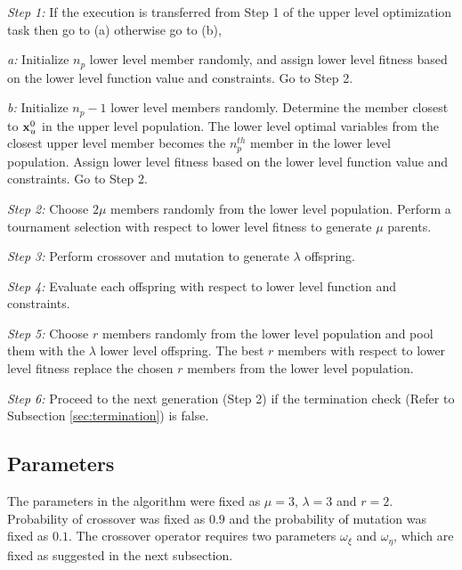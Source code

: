 \documentclass[twoside]{article}
\begin{document}
\textit{}
\vspace{-7mm}

\textit{Step 1:} If the execution is transferred from Step 1 of the upper level optimization task then go to (a) otherwise go to (b),

\quad \textit{a:} Initialize $n_p$ lower level member randomly, and assign lower level fitness based on the lower level function value and constraints. Go to Step 2.

\quad \textit{b:} Initialize $n_p-1$ lower level members randomly. Determine the member closest to $\mbox{$\mathbf{x}$}_{u}^{0}$ in the upper level population. The lower level optimal variables from the closest upper level member becomes the $n_{p}^{th}$ member in the lower level population. Assign lower level fitness based on the lower level function value and constraints. Go to Step 2.

\textit{Step 2:} Choose $2\mu$ members randomly from the lower level population. Perform a tournament selection with respect to lower level fitness to generate $\mu$ parents. 

\textit{Step 3:} Perform crossover and mutation to generate $\lambda$ offspring.

\textit{Step 4:} Evaluate each offspring with respect to lower level function and constraints.

\textit{Step 5:} Choose $r$ members randomly from the lower level population and pool them with the $\lambda$ lower level offspring. The best $r$ members with respect to lower level fitness replace the chosen $r$ members from the lower level population.

\textit{Step 6:} Proceed to the next generation (Step 2) if the termination check (Refer to Subsection \ref{sec:termination}) is false.

\subsection{Parameters}
The parameters in the algorithm were fixed as $\mu=3$, $\lambda=3$ and $r=2$. Probability of crossover was fixed as $0.9$ and the probability of mutation was fixed as $0.1$. The crossover operator requires two parameters $\omega_{\xi}$ and $\omega_{\eta}$, which are fixed as suggested in the next subsection.
\end{document}
